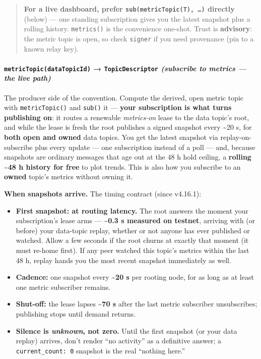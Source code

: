 \documentclass[
  nobib]{tufte-handout}
\providecommand{\tightlist}{%
  \setlength{\itemsep}{0pt}\setlength{\parskip}{0pt}}
\begin{document}
\begin{quote}
\textbf{For a live dashboard, prefer \texttt{sub(metricTopic(T),\ …)}
directly} (below) --- one standing subscription gives you the latest
snapshot plus a rolling history. \texttt{metrics()} is the convenience
one-shot. Trust is \textbf{advisory}: the metric topic is open, so check
\texttt{signer} if you need provenance (pin to a known relay key).
\end{quote}

\paragraph{\texorpdfstring{\texttt{metricTopic(dataTopicId)} →
\texttt{TopicDescriptor} \emph{(subscribe to metrics --- the live
path)}}{metricTopic(dataTopicId) → TopicDescriptor (subscribe to metrics --- the live path)}}\label{metrictopicdatatopicid-topicdescriptor-subscribe-to-metrics-the-live-path}

The producer side of the convention. Compute the derived, open metric
topic with \texttt{metricTopic()} and \texttt{sub()} it --- \textbf{your
subscription is what turns publishing on}: it routes a renewable
\emph{metrics-on} lease to the data topic's root, and while the lease is
fresh the root publishes a signed snapshot every \textasciitilde20 s,
for \textbf{both open and owned} data topics. You get the latest
snapshot via replay-on-subscribe plus every update --- one subscription
instead of a poll --- and, because snapshots are ordinary messages that
age out at the 48 h hold ceiling, a \textbf{rolling \textasciitilde48 h
history for free} to plot trends. This is also how you subscribe to an
\textbf{owned} topic's metrics without owning it.

\textbf{When snapshots arrive.} The timing contract (since v4.16.1):

\begin{itemize}
\tightlist
\item
  \textbf{First snapshot: at routing latency.} The root answers the
  moment your subscription's lease arms --- \textbf{\textasciitilde0.3 s
  measured on testnet}, arriving with (or before) your data-topic
  replay, whether or not anyone has ever published or watched. Allow a
  few seconds if the root churns at exactly that moment (it must re-home
  first). If any peer watched this topic's metrics within the last 48 h,
  replay hands you the most recent snapshot immediately as well.
\item
  \textbf{Cadence:} one snapshot every \textbf{\textasciitilde20 s} per
  rooting node, for as long as at least one metric subscriber remains.
\item
  \textbf{Shut-off:} the lease lapses \textbf{\textasciitilde70 s} after
  the last metric subscriber unsubscribes; publishing stops until demand
  returns.
\item
  \textbf{Silence is \emph{unknown}, not zero.} Until the first snapshot
  (or your data replay) arrives, don't render ``no activity'' as a
  definitive answer; a \texttt{current\_count:\ 0} snapshot is the real
  ``nothing here.''
\end{itemize}
\end{document}
